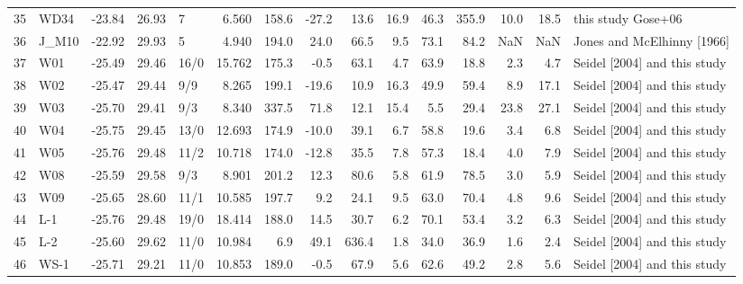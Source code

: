\documentclass{article}
\begin{document}
{\begin{tabular}{llrrlrrrrrrrrrl}
35 &              WD34 &        -23.84 &          26.93 &      7 &   6.560 &  158.6 & -27.2 &   13.6 &  16.9 &  46.3 &  355.9 &  10.0 &  18.5 &             this study Gose+06 \\
36 &             J\_M10 &        -22.92 &          29.93 &      5 &   4.940 &  194.0 &  24.0 &   66.5 &   9.5 &  73.1 &   84.2 &   NaN &   NaN &     Jones and McElhinny [1966] \\
37 &               W01 &        -25.49 &          29.46 &   16/0 &  15.762 &  175.3 &  -0.5 &   63.1 &   4.7 &  63.9 &   18.8 &   2.3 &   4.7 &   Seidel [2004] and this study \\
38 &               W02 &        -25.47 &          29.44 &    9/9 &   8.265 &  199.1 & -19.6 &   10.9 &  16.3 &  49.9 &   59.4 &   8.9 &  17.1 &   Seidel [2004] and this study \\
39 &               W03 &        -25.70 &          29.41 &    9/3 &   8.340 &  337.5 &  71.8 &   12.1 &  15.4 &   5.5 &   29.4 &  23.8 &  27.1 &   Seidel [2004] and this study \\
40 &               W04 &        -25.75 &          29.45 &   13/0 &  12.693 &  174.9 & -10.0 &   39.1 &   6.7 &  58.8 &   19.6 &   3.4 &   6.8 &   Seidel [2004] and this study \\
41 &               W05 &        -25.76 &          29.48 &   11/2 &  10.718 &  174.0 & -12.8 &   35.5 &   7.8 &  57.3 &   18.4 &   4.0 &   7.9 &   Seidel [2004] and this study \\
42 &               W08 &        -25.59 &          29.58 &    9/3 &   8.901 &  201.2 &  12.3 &   80.6 &   5.8 &  61.9 &   78.5 &   3.0 &   5.9 &   Seidel [2004] and this study \\
43 &               W09 &        -25.65 &          28.60 &   11/1 &  10.585 &  197.7 &   9.2 &   24.1 &   9.5 &  63.0 &   70.4 &   4.8 &   9.6 &   Seidel [2004] and this study \\
44 &               L-1 &        -25.76 &          29.48 &   19/0 &  18.414 &  188.0 &  14.5 &   30.7 &   6.2 &  70.1 &   53.4 &   3.2 &   6.3 &   Seidel [2004] and this study \\
45 &               L-2 &        -25.60 &          29.62 &   11/0 &  10.984 &    6.9 &  49.1 &  636.4 &   1.8 &  34.0 &   36.9 &   1.6 &   2.4 &   Seidel [2004] and this study \\
46 &              WS-1 &        -25.71 &          29.21 &   11/0 &  10.853 &  189.0 &  -0.5 &   67.9 &   5.6 &  62.6 &   49.2 &   2.8 &   5.6 &   Seidel [2004] and this study \\

\end{tabular}}
\end{document}
